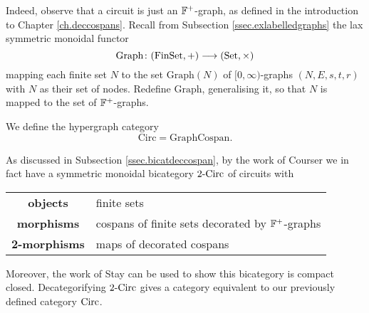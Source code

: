Indeed, observe that a circuit is just an ${\mathbb F}^+$-graph, as defined in the
introduction to Chapter \ref{ch.deccospans}.  Recall from Subsection
\ref{ssec.exlabelledgraphs} the lax symmetric monoidal functor
\[
  \mathrm{Graph}{\colon} (\mathrm{FinSet},+) \longrightarrow (\mathrm{Set},\times)
\]
mapping each finite set $N$ to the set $\mathrm{Graph}(N)$ of
$[0,\infty)$-graphs $(N,E,s,t,r)$ with $N$ as their set of nodes. Redefine
$\mathrm{Graph}$, generalising it, so that $N$ is mapped to the set of
${\mathbb F}^+$-graphs.
  
\begin{definition}
  We define the hypergraph category
  \[
    \mathrm{Circ} = \mathrm{GraphCospan} .
  \]
\end{definition}

\begin{aside}
  As discussed in Subsection \ref{ssec.bicatdeccospan}, by the work of Courser
  \cite{Cou16} we in fact have a symmetric monoidal bicategory $2\mbox{-}\mathrm{Circ}$
  of circuits with 
  \begin{center}
    \begin{tabular}{ c | p{} }
      \textbf{objects} & finite sets \\ 
      \textbf{morphisms} & cospans of finite sets decorated by ${\mathbb F}^+$-graphs \\ 
      \textbf{2-morphisms} & maps of decorated cospans \\
    \end{tabular}
  \end{center}
  Moreover, the work of Stay \cite{Sta16} can be used to show this bicategory is
  compact closed.  Decategorifying $2\mbox{-}\mathrm{Circ}$ gives a category equivalent
  to our previously defined category $\mathrm{Circ}$.
\end{aside}

